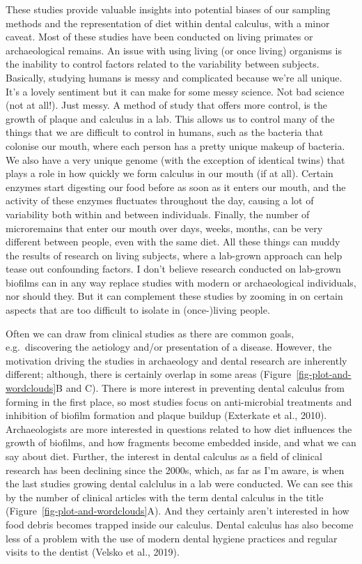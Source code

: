 \documentclass[
  letterpaper,
]{book}
\begin{document}
These studies provide valuable insights into potential biases of our
sampling methods and the representation of diet within dental calculus,
with a minor caveat. Most of these studies have been conducted on living
primates or archaeological remains. An issue with using living (or once
living) organisms is the inability to control factors related to the
variability between subjects. Basically, studying humans is messy and
complicated because we're all unique. It's a lovely sentiment but it can
make for some messy science. Not bad science (not at all!). Just messy.
A method of study that offers more control, is the growth of plaque and
calculus in a lab. This allows us to control many of the things that we
are difficult to control in humans, such as the bacteria that colonise
our mouth, where each person has a pretty unique makeup of bacteria. We
also have a very unique genome (with the exception of identical twins)
that plays a role in how quickly we form calculus in our mouth (if at
all). Certain enzymes start digesting our food before as soon as it
enters our mouth, and the activity of these enzymes fluctuates
throughout the day, causing a lot of variability both within and between
individuals. Finally, the number of microremains that enter our mouth
over days, weeks, months, can be very different between people, even
with the same diet. All these things can muddy the results of research
on living subjects, where a lab-grown approach can help tease out
confounding factors. I don't believe research conducted on lab-grown
biofilms can in any way replace studies with modern or archaeological
individuals, nor should they. But it can complement these studies by
zooming in on certain aspects that are too difficult to isolate in
(once-)living people.

Often we can draw from clinical studies as there are common goals,
e.g.~discovering the aetiology and/or presentation of a disease.
However, the motivation driving the studies in archaeology and dental
research are inherently different; although, there is certainly overlap
in some areas (Figure~\ref{fig-plot-and-wordclouds}B and C). There is
more interest in preventing dental calculus from forming in the first
place, so most studies focus on anti-microbial treatments and inhibition
of biofilm formation and plaque buildup (Exterkate et al., 2010).
Archaeologists are more interested in questions related to how diet
influences the growth of biofilms, and how fragments become embedded
inside, and what we can say about diet. Further, the interest in dental
calculus as a field of clinical research has been declining since the
2000s, which, as far as I'm aware, is when the last studies growing
dental calclulus in a lab were conducted. We can see this by the number
of clinical articles with the term dental calculus in the title
(Figure~\ref{fig-plot-and-wordclouds}A). And they certainly aren't
interested in how food debris becomes trapped inside our calculus.
Dental calculus has also become less of a problem with the use of modern
dental hygiene practices and regular visits to the dentist (Velsko et
al., 2019).
\end{document}
